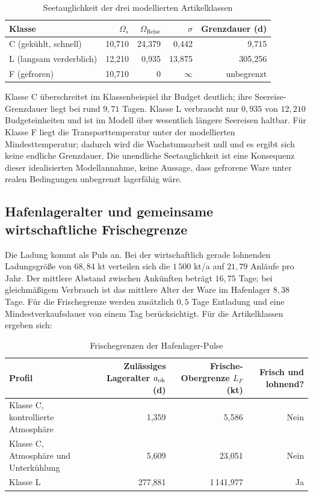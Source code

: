 \documentclass[a4paper, 12pt, twoside, openright]{report}
\theoremstyle{definition}
\theoremstyle{definition}
\begin{document}
\begin{table}[htbp]
  \centering
  \caption{Seetauglichkeit der drei modellierten Artikelklassen}
  \label{tab:experiment-seefracht-klassen}
  \begin{tabular}{lrrrr}
    \toprule
    Klasse & $\Omega_s$ & $\Omega_{\mathrm{Reise}}$ & $\sigma$ &
      Grenzdauer (d) \\
    \midrule
    C (gekühlt, schnell) & 10{,}710 & 24{,}379 & 0{,}442 & 9{,}715 \\
    L (langsam verderblich) & 12{,}210 & 0{,}935 & 13{,}875 & 305{,}256 \\
    F (gefroren) & 10{,}710 & 0 & $\infty$ & unbegrenzt \\
    \bottomrule
  \end{tabular}
\end{table}

Klasse C überschreitet im Klassenbeispiel ihr Budget deutlich; ihre
Seereise-Grenzdauer liegt bei rund $9{,}71$ Tagen. Klasse L verbraucht nur
$0{,}935$ von $12{,}210$ Budgeteinheiten und ist im Modell über wesentlich
längere Seereisen haltbar. Für Klasse F liegt die Transporttemperatur unter
der modellierten Mindesttemperatur; dadurch wird die Wachstumsarbeit null und
es ergibt sich keine endliche Grenzdauer. Die unendliche Seetauglichkeit ist
eine Konsequenz dieser idealisierten Modellannahme, keine Aussage, dass
gefrorene Ware unter realen Bedingungen unbegrenzt lagerfähig wäre.

\subsection{Hafenlageralter und gemeinsame wirtschaftliche Frischegrenze}

Die Ladung kommt als Puls an. Bei der wirtschaftlich gerade lohnenden
Ladungsgröße von $68{,}84$ kt verteilen sich die $1\,500$ kt/a auf $21{,}79$
Anläufe pro Jahr. Der mittlere Abstand zwischen Ankünften beträgt
$16{,}75$ Tage; bei gleichmäßigem Verbrauch ist das mittlere Alter der Ware
im Hafenlager $8{,}38$ Tage. Für die Frischegrenze werden zusätzlich
$0{,}5$ Tage Entladung und eine Mindestverkaufsdauer von einem Tag
berücksichtigt. Für die Artikelklassen ergeben sich:

\begin{table}
  \centering
  \caption{Frischegrenzen der Hafenlager-Pulse}
  \label{tab:experiment-seefracht-frische}
  \begin{tabular}{lrrr}
    \toprule
    Profil & Zulässiges Lageralter $a_{\rm ok}$ (d) &
      Frische-Obergrenze $L_F$ (kt) & Frisch und lohnend? \\
    \midrule
    Klasse C, kontrollierte Atmosphäre & 1{,}359 & 5{,}586 & Nein \\
    Klasse C, Atmosphäre und Unterkühlung & 5{,}609 & 23{,}051 & Nein \\
    Klasse L & 277{,}881 & 1\,141{,}977 & Ja \\
    \bottomrule
  \end{tabular}
\end{table}
\end{document}
